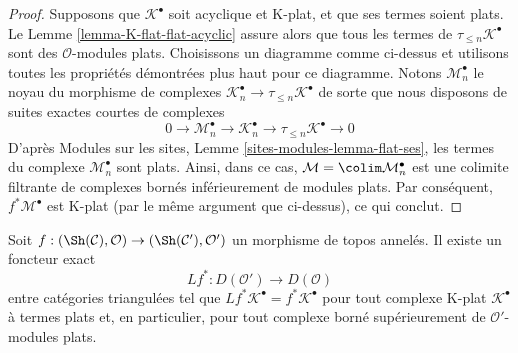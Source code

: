 \begin{proof}
\medskip\noindent
Supposons que $\mathcal{K}^\bullet$ soit acyclique et K-plat, et que ses
termes soient plats. Le Lemme \ref{lemma-K-flat-flat-acyclic} assure alors
que tous les termes de $\tau_{\leq n}\mathcal{K}^\bullet$ sont des
$\mathcal{O}$-modules plats. Choisissons un diagramme comme ci-dessus et
utilisons toutes les propriétés démontrées plus haut pour ce diagramme.
Notons $\mathcal{M}_n^\bullet$ le noyau du morphisme de complexes
$\mathcal{K}_n^\bullet \to \tau_{\leq n}\mathcal{K}^\bullet$
de sorte que nous disposons de suites exactes courtes de complexes
$$
0 \to \mathcal{M}_n^\bullet \to \mathcal{K}_n^\bullet \to
\tau_{\leq n}\mathcal{K}^\bullet \to 0
$$
D'après Modules sur les sites, Lemme \ref{sites-modules-lemma-flat-ses},
les termes du complexe $\mathcal{M}_n^\bullet$ sont plats. Ainsi, dans ce
cas, $\mathcal{M} = \colim \mathcal{M}_n^\bullet$ est une colimite filtrante
de complexes bornés inférieurement de modules plats. Par conséquent,
$f^*\mathcal{M}^\bullet$ est K-plat (par le même argument que ci-dessus),
ce qui conclut.
\end{proof}

\begin{lemma}
\label{lemma-derived-base-change}
Soit $f : (\Sh(\mathcal{C}), \mathcal{O}) \to (\Sh(\mathcal{C}'), \mathcal{O}')$
un morphisme de topos annelés. Il existe un foncteur exact
$$
Lf^* : D(\mathcal{O}') \longrightarrow D(\mathcal{O})
$$
entre catégories triangulées tel que
$Lf^*\mathcal{K}^\bullet = f^*\mathcal{K}^\bullet$ pour tout complexe
K-plat $\mathcal{K}^\bullet$ à termes plats et, en particulier, pour tout
complexe borné supérieurement de $\mathcal{O}'$-modules plats.
\end{lemma}

